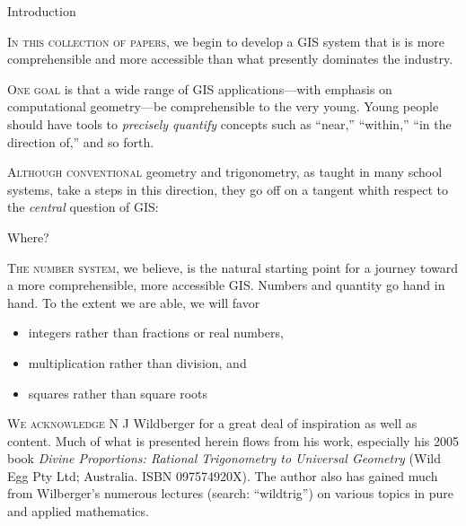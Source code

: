\documentclass{letter}
\begin{document}
\begin{center}
Introduction
\end{center}

\newcommand{\en}{\phantom{N}}
\noindent
\textsc{In this collection of papers},
we begin to develop a GIS system that is is more comprehensible
and more accessible than what presently dominates the industry.

\textsc{One goal}
is that a wide range of GIS applications---with
emphasis on computational geometry---be
comprehensible to the very young.
Young people should have tools to \emph{precisely quantify}
concepts such as ``near,'' ``within,'' ``in the direction of,''
and so forth.

\textsc{Although conventional}
geometry and trigonometry, as taught in many school systems,
take a steps in this direction,
they go off on a tangent whith respect to
the \emph{central} question of GIS:
\begin{center}
Where?
\end{center}

\textsc{The number system}, we believe, is the natural starting point
for a journey toward a more comprehensible, more accessible GIS.
Numbers and quantity go hand in hand.
To the extent we are able, we will favor
\begin{itemize}
\item integers rather than fractions or real numbers,
\item multiplication rather than division, and
\item squares rather than square roots
\end{itemize}

\textsc{We acknowledge} N J Wildberger for a great deal of inspiration as well as content.
Much of what is presented herein flows from his work,
especially his 2005 book
\textit{Divine Proportions: Rational Trigonometry to Universal Geometry}
(Wild Egg Pty Ltd; Australia. ISBN 097574920X).
The author also has gained much from Wilberger's numerous
lectures (search: ``wildtrig'') on various topics in pure and
applied mathematics.
\end{document}
